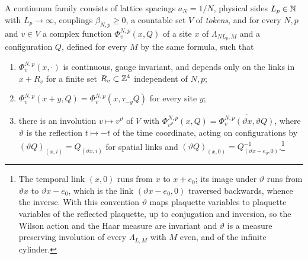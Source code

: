 \begin{definition}\label{def:family}
A continuum family consists of lattice spacings $a_N=1/N$, physical sides
$L_p\in\mathbb{N}$ with $L_p\to\infty$, couplings $\beta_{N,p}\ge0$, a countable set
$V$ of \emph{tokens}, and for every $N,p$ and $v\in V$ a complex function
$\Phi^{N,p}_v(x,Q)$ of a site $x$ of $\Lambda_{NL_p,M}$ and a configuration
$Q$, defined for every $M$ by the same formula, such that
\begin{enumerate}[label=\textup{(F\arabic*)},leftmargin=*]
\item $\Phi^{N,p}_v(x,\cdot)$ is continuous, gauge invariant, and depends only on
the links in $x+R_v$ for a finite set $R_v\subset\mathbb{Z}^4$ independent of $N,p$;
\item $\Phi^{N,p}_v(x+y,Q)=\Phi^{N,p}_v(x,\tau_{-y}Q)$ for every site $y$;
\item there is an involution $v\mapsto v^\vartheta$ of $V$ with
$\Phi^{N,p}_{v^\vartheta}(x,Q)=\overline{\Phi^{N,p}_v(\vartheta x,\vartheta Q)}$,
where $\vartheta$ is the reflection $t\mapsto-t$ of the time coordinate,
acting on configurations by $(\vartheta Q)_{(x,i)}=Q_{(\vartheta x,i)}$ for
spatial links and $(\vartheta Q)_{(x,0)}=Q_{(\vartheta x-e_0,0)}^{-1}$.\footnote{The
temporal link $(x,0)$ runs from $x$ to $x+e_0$; its image under $\vartheta$
runs from $\vartheta x$ to $\vartheta x-e_0$, which is the link
$(\vartheta x-e_0,0)$ traversed backwards, whence the inverse. With this
convention $\vartheta$ maps plaquette variables to plaquette variables of
the reflected plaquette, up to conjugation and inversion, so the Wilson
action and the Haar measure are invariant and $\vartheta$ is a measure
preserving involution of every $\Lambda_{L,M}$ with $M$ even, and of the
infinite cylinder.}
\end{enumerate}
\end{definition}


